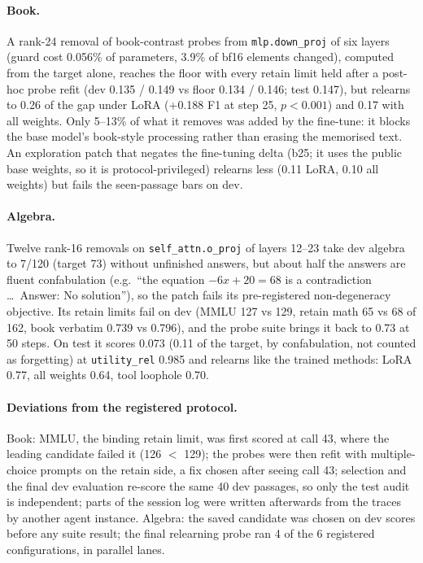 \documentclass[10pt,twocolumn,letterpaper]{article}
\newcommand{\eg}{e.g.\ }
\begin{document}
\paragraph{Book.} A rank-24 removal of book-contrast probes from \texttt{mlp.down\_proj} of six layers (guard cost 0.056\%
of parameters, 3.9\% of bf16 elements changed), computed from the target alone, reaches the floor with every retain limit
held after a post-hoc probe refit (dev 0.135 / 0.149 vs floor 0.134 / 0.146; test 0.147), but relearns to 0.26 of the gap
under LoRA (+0.188 F1 at step 25, $p<0.001$) and 0.17 with all weights. Only 5--13\% of what it removes was added by the
fine-tune: it blocks the base model's book-style processing rather than erasing the memorised text. An exploration patch
that negates the fine-tuning delta (b25; it uses the public base weights, so it is protocol-privileged) relearns less
(0.11 LoRA, 0.10 all weights) but fails the seen-passage bars on dev.

\paragraph{Algebra.} Twelve rank-16 removals on \texttt{self\_attn.o\_proj} of layers 12--23 take dev algebra to 7/120
(target 73) without unfinished answers, but about half the answers are fluent confabulation (\eg ``the equation
$-6x + 20 = 68$ is a contradiction \ldots\ Answer: No solution''), so the patch fails its pre-registered non-degeneracy
objective. Its retain limits fail on dev (MMLU 127 vs 129, retain math 65 vs 68 of 162, book verbatim 0.739 vs 0.796),
and the probe suite brings it back to 0.73 at 50 steps. On test it scores 0.073 (0.11 of the target, by confabulation, not
counted as forgetting) at \texttt{utility\_rel} 0.985 and relearns like the trained methods: LoRA 0.77, all weights 0.64,
tool loophole 0.70.

\paragraph{Deviations from the registered protocol.} Book: MMLU, the binding retain limit, was first scored at call 43,
where the leading candidate failed it (126 $<$ 129); the probes were then refit with multiple-choice prompts on the retain
side, a fix chosen after seeing call 43; selection and the final dev evaluation re-score the same 40 dev passages, so only
the test audit is independent; parts of the session log were written afterwards from the traces by another agent
instance. Algebra: the saved candidate was chosen on dev scores before any suite result; the final relearning probe ran 4
of the 6 registered configurations, in parallel lanes.
\end{document}
